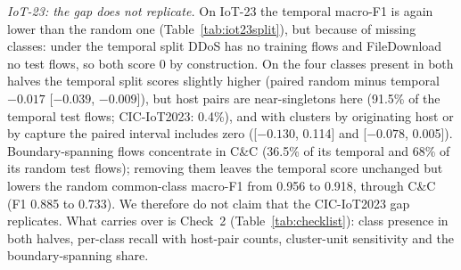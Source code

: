 \emph{IoT-23: the gap does not replicate.} On IoT-23 the temporal macro-F1 is again lower than the random one (Table~\ref{tab:iot23split}), but because of missing classes: under the temporal split DDoS has no training flows and FileDownload no test flows, so both score 0 by construction. On the four classes present in both halves the temporal split scores slightly higher (paired random minus temporal $-0.017$ [$-0.039$, $-0.009$]), but host pairs are near-singletons here (91.5\% of the temporal test flows; CIC-IoT2023: 0.4\%), and with clusters by originating host or by capture the paired interval includes zero ([$-0.130$, 0.114] and [$-0.078$, 0.005]). Boundary-spanning flows concentrate in C\&C (36.5\% of its temporal and 68\% of its random test flows); removing them leaves the temporal score unchanged but lowers the random common-class macro-F1 from 0.956 to 0.918, through C\&C (F1 0.885 to 0.733). We therefore do not claim that the CIC-IoT2023 gap replicates. What carries over is Check~2 (Table~\ref{tab:checklist}): class presence in both halves, per-class recall with host-pair counts, cluster-unit sensitivity and the boundary-spanning share.
